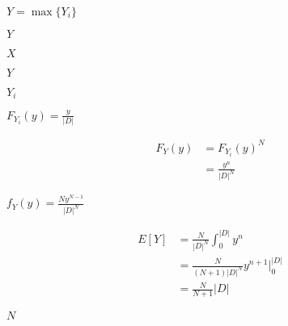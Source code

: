 \documentclass[10pt]{book}
\begin{document}
\begin{mdSnippets}
\begin{mdInlineSnippet}%
$Y = \max \{Y_i \}$\end{mdInlineSnippet}%
\begin{mdInlineSnippet}[57cec4137b614c87cb4e24a3d003a3e0]%
$Y$\end{mdInlineSnippet}%
\begin{mdInlineSnippet}[02129bb861061d1a052c592e2dc6b383]%
$X$\end{mdInlineSnippet}%
\begin{mdInlineSnippet}[57cec4137b614c87cb4e24a3d003a3e0]%
$Y$\end{mdInlineSnippet}%
\begin{mdInlineSnippet}%
$Y_i$\end{mdInlineSnippet}%
\begin{mdInlineSnippet}[a6e1202098708f2b56d6b66ef2446eec]%
$F_{Y_i}(y) = \frac{y}{|D|}$\end{mdInlineSnippet}%
\begin{mdDisplaySnippet}[ab37370794bc79b4d289bf0e0fa0e1e1]%
\[%
\begin{aligned}
F_Y(y) &= F_{Y_i}(y)^N \\
&= \frac{y^n}{|D|^N}
\end{aligned}
\]%
\end{mdDisplaySnippet}%
\begin{mdInlineSnippet}[c37375cf02808e495c89947f18ae1c4c]%
$f_Y(y) = \frac{Ny^{N-1}}{|D|^N}$\end{mdInlineSnippet}%
\begin{mdDisplaySnippet}[d074e26716da8c72f890fa3bf5a319a3]%
\[%
\begin{aligned}
E[Y] &= \frac{N}{|D|^N} \int_0^{|D|} y^n \\
&= \frac{N}{(N+1)|D|^N}y^{n+1} \biggr|_0^{|D|}\\
&= \frac{N}{N+1}|D|
\end{aligned}
\]%
\end{mdDisplaySnippet}%
\begin{mdInlineSnippet}[8d9c307cb7f3c4a32822a51922d1ceaa]%
$N$\end{mdInlineSnippet}%
\begin{mdDisplaySnippet}%

\end{mdDisplaySnippet}
\end{mdSnippets}
\end{document}
